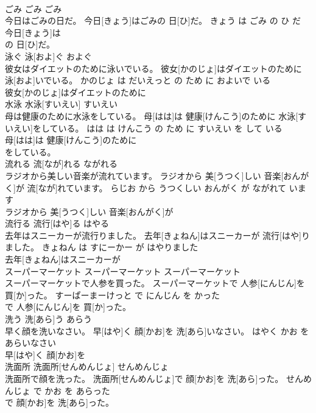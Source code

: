 \documentclass[8pt]{extreport}
\begin{document}
\begin{CJK}{UTF8}{min}
\\	ごみ	ごみ	ごみ	
\\	今日はごみの日だ。	今日[きょう]はごみの 日[ひ]だ。	きょう は ごみ の ひ だ	
\\	今日[きょう]は
\\	の 日[ひ]だ。		
\\	泳ぐ	泳[およ]ぐ	およぐ	
\\	彼女はダイエットのために泳いでいる。	彼女[かのじょ]はダイエットのために 泳[およ]いでいる。	かのじょ は だいえっと の ため に およいで いる	
\\	彼女[かのじょ]はダイエットのために
\\	水泳	水泳[すいえい]	すいえい	
\\	母は健康のために水泳をしている。	母[はは]は 健康[けんこう]のために 水泳[すいえい]をしている。	はは は けんこう の ため に すいえい を して いる	
\\	母[はは]は 健康[けんこう]のために
\\	をしている。		
\\	流れる	流[なが]れる	ながれる	
\\	ラジオから美しい音楽が流れています。	ラジオから 美[うつく]しい 音楽[おんがく]が 流[なが]れています。	らじお から うつくしい おんがく が ながれて います	
\\	ラジオから 美[うつく]しい 音楽[おんがく]が
\\	流行る	流行[はや]る	はやる	
\\	去年はスニーカーが流行りました。	去年[きょねん]はスニーカーが 流行[はや]りました。	きょねん は すにーかー が はやりました	
\\	去年[きょねん]はスニーカーが
\\	スーパーマーケット	スーパーマーケット	スーパーマーケット	
\\	スーパーマーケットで人参を買った。	スーパーマーケットで 人参[にんじん]を 買[か]った。	すーぱーまーけっと で にんじん を かった	
\\	で 人参[にんじん]を 買[か]った。		
\\	洗う	洗[あら]う	あらう	
\\	早く顔を洗いなさい。	早[はや]く 顔[かお]を 洗[あら]いなさい。	はやく かお を あらいなさい	
\\	早[はや]く 顔[かお]を
\\	洗面所	洗面所[せんめんじょ]	せんめんじょ	
\\	洗面所で顔を洗った。	洗面所[せんめんじょ]で 顔[かお]を 洗[あら]った。	せんめんじょ で かお を あらった	
\\	で 顔[かお]を 洗[あら]った。		

\end{CJK}
\end{document}
